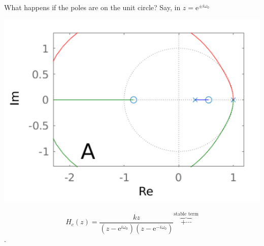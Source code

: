 \documentclass[presentation,aspectratio=169]{beamer}
\begin{document}
\begin{frame}[label=sec-3-8]{What happens if the poles are \alert{on the} unit circle?}
Say, in \(z = \mathrm{e}^{\pm i \omega_0}\)
\begin{center}
\includegraphics[width=0.3\linewidth]{../../figures/rlocusA.png}
\end{center}

\[H_c(z) = \frac{k z}{(z-\mathrm{e}^{i \omega_0})(z-\mathrm{e}^{-i \omega_0})} \overbrace{+ \cdots}^{\text{stable term}}\].
\end{frame}
\end{document}
